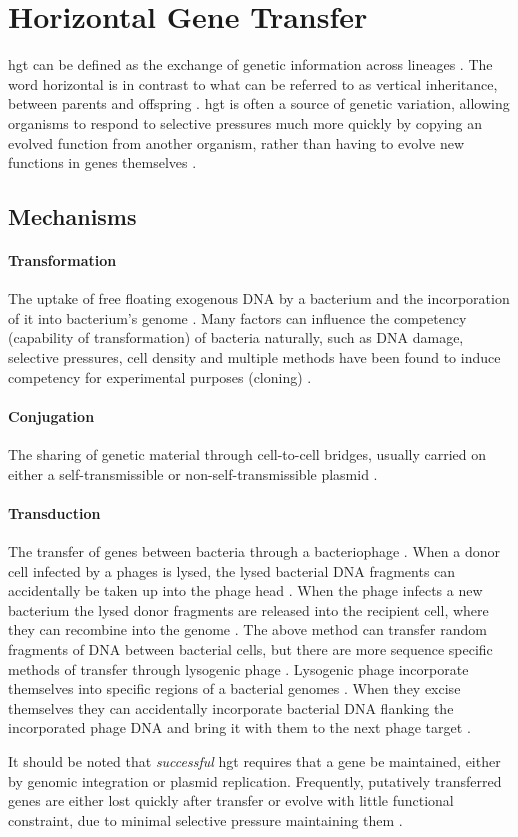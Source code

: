\section{Horizontal Gene Transfer}
\ac{hgt} can be defined as the exchange of genetic information across lineages \citep{lgt}.
The word horizontal is in contrast to what can be referred to as vertical inheritance, between parents and offspring \citep{ihgt}.
\ac{hgt} is often a source of genetic variation, allowing organisms to respond to selective pressures much more quickly by copying an evolved function from another organism, rather than having to evolve new functions in genes themselves \citep{ihgt,adaevo}.\par
\subsection{Mechanisms}
\paragraph{Transformation}
The uptake of free floating exogenous DNA by a bacterium and the incorporation of it into bacterium's genome \citep{lgt}.
Many factors can influence the competency (capability of transformation) of bacteria naturally, such as DNA damage, selective pressures, cell density and multiple methods have been found to induce competency for experimental purposes (cloning) \citep{natcomp}.
\paragraph{Conjugation}
The sharing of genetic material through cell-to-cell bridges, usually carried on either a self-transmissible or non-self-transmissible plasmid \citep{conjug}.
\paragraph{Transduction}
The transfer of genes between bacteria through a bacteriophage \citep{transd}.
When a donor cell infected by a phages is lysed, the lysed bacterial DNA fragments can accidentally be taken up into the phage head \citep{transd}.
When the phage infects a new bacterium the lysed donor fragments are released into the recipient cell, where they can recombine into the genome \citep{transd}.
The above method can transfer random fragments of DNA between bacterial cells, but there are more sequence specific methods of transfer through lysogenic phage \citep{transd}.
Lysogenic phage incorporate themselves into specific regions of a bacterial genomes \citep{transd}.
When they excise themselves they can accidentally incorporate bacterial DNA flanking the incorporated phage DNA and bring it with them to the next phage target \citep{transd}.\par
It should be noted that \textit{successful} \ac{hgt} requires that a gene be maintained, either by genomic integration or plasmid replication.
Frequently, putatively transferred genes are either lost quickly after transfer or evolve with little functional constraint, due to minimal selective pressure maintaining them \citep{fastlane}.
